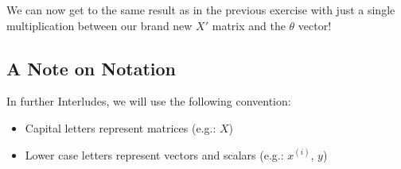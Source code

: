 We can now get to the same result as in the previous exercise with just a single multiplication between our brand new $X'$ matrix and the $\theta$ vector!

\subsection*{A Note on Notation}
In further Interludes, we will use the following convention:  
\begin{itemize}
    \item Capital letters represent matrices (e.g.: $X$)
    \item Lower case letters represent vectors and scalars (e.g.: $x^{(i)}$, $y$)
\end{itemize}
